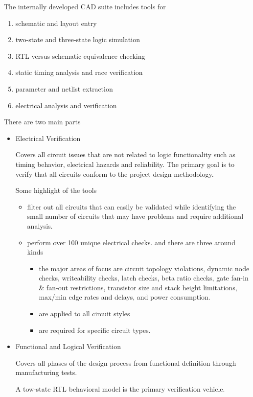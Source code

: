 \documentclass[11pt]{article}
\begin{document}
The internally developed CAD suite includes tools for
\begin{enumerate}
	\item schematic and layout entry
	\item two-state and three-state logic simulation
	\item RTL versus schematic equivalence checking
	\item static timing analysis and race verification
	\item parameter and netlist extraction
	\item electrical analysis and verification
\end{enumerate} 
There are two main parts \begin{itemize}
	\item Electrical Verification
	
	Covers all circuit issues that are not related to logic functionality such as timing behavior, electrical hazards and reliability. The primary goal is to verify that all circuits conform to the project design methodology. 
	
	Some highlight of the tools
	\begin{itemize}
		\item filter out all circuits that can easily be validated while identifying the small number of circuits that may have problems and require additional analysis.
		\item perform over 100 unique electrical checks. and there are three around kinds \begin{itemize}
			\item the major areas of focus are circuit topology violations, dynamic node checks, writeability checks, latch checks, beta ratio checks, gate fan-in \& fan-out restrictions, transistor size and stack height limitations, max/min edge rates and delays, and power consumption.
			\item are applied to all circuit styles
			\item are required for specific circuit types. 
		\end{itemize}
	\end{itemize}
	\item Functional and Logical Verification
	
	Covers all phases of the design process from functional definition through manufacturing tests.
	
	A tow-state RTL behavioral model is the primary verification vehicle.
\end{itemize}
\end{document}
